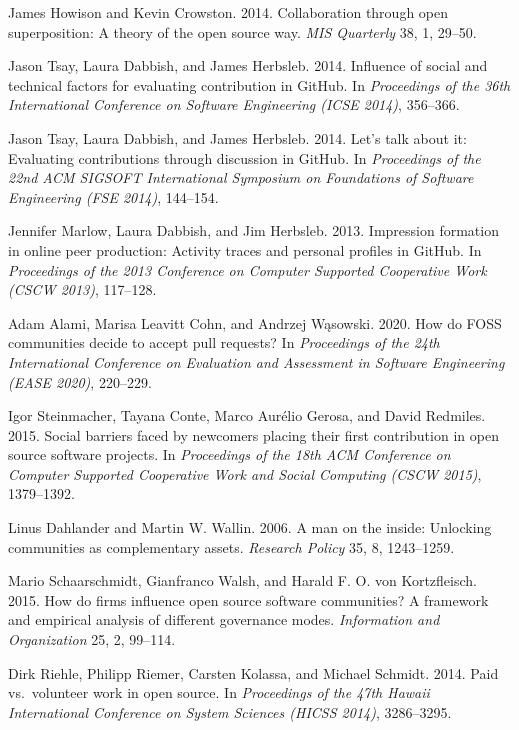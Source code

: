 James Howison and Kevin Crowston. 2014. Collaboration through open superposition: A theory of the open source way. \emph{MIS Quarterly} 38, 1, 29--50.

Jason Tsay, Laura Dabbish, and James Herbsleb. 2014. Influence of social and technical factors for evaluating contribution in GitHub. In \emph{Proceedings of the 36th International Conference on Software Engineering (ICSE 2014)}, 356--366.

Jason Tsay, Laura Dabbish, and James Herbsleb. 2014. Let's talk about it: Evaluating contributions through discussion in GitHub. In \emph{Proceedings of the 22nd ACM SIGSOFT International Symposium on Foundations of Software Engineering (FSE 2014)}, 144--154.

Jennifer Marlow, Laura Dabbish, and Jim Herbsleb. 2013. Impression formation in online peer production: Activity traces and personal profiles in GitHub. In \emph{Proceedings of the 2013 Conference on Computer Supported Cooperative Work (CSCW 2013)}, 117--128.

Adam Alami, Marisa Leavitt Cohn, and Andrzej W\k{a}sowski. 2020. How do FOSS communities decide to accept pull requests? In \emph{Proceedings of the 24th International Conference on Evaluation and Assessment in Software Engineering (EASE 2020)}, 220--229.

Igor Steinmacher, Tayana Conte, Marco Aur\'elio Gerosa, and David Redmiles. 2015. Social barriers faced by newcomers placing their first contribution in open source software projects. In \emph{Proceedings of the 18th ACM Conference on Computer Supported Cooperative Work and Social Computing (CSCW 2015)}, 1379--1392.

Linus Dahlander and Martin W. Wallin. 2006. A man on the inside: Unlocking communities as complementary assets. \emph{Research Policy} 35, 8, 1243--1259.

Mario Schaarschmidt, Gianfranco Walsh, and Harald F. O. von Kortzfleisch. 2015. How do firms influence open source software communities? A framework and empirical analysis of different governance modes. \emph{Information and Organization} 25, 2, 99--114.

Dirk Riehle, Philipp Riemer, Carsten Kolassa, and Michael Schmidt. 2014. Paid vs.\ volunteer work in open source. In \emph{Proceedings of the 47th Hawaii International Conference on System Sciences (HICSS 2014)}, 3286--3295.

